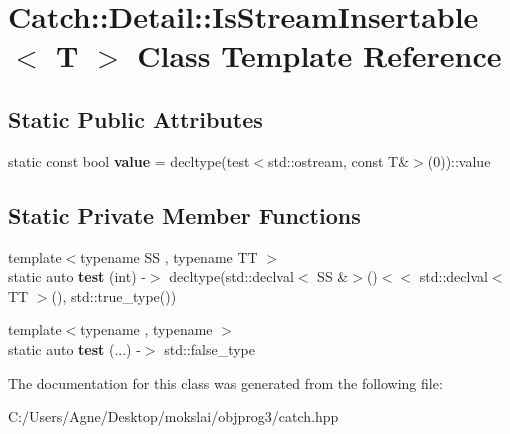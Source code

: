 \hypertarget{class_catch_1_1_detail_1_1_is_stream_insertable}{}\section{Catch\+:\+:Detail\+:\+:Is\+Stream\+Insertable$<$ T $>$ Class Template Reference}
\label{class_catch_1_1_detail_1_1_is_stream_insertable}
\subsection*{Static Public Attributes}
\begin{DoxyCompactItemize}
\item 
\mbox{\label{class_catch_1_1_detail_1_1_is_stream_insertable_a42818b09ae5851126a70ee263769e309}} 
static const bool {\bfseries value} = decltype(test$<$std\+::ostream, const T\&$>$(0))\+::value
\end{DoxyCompactItemize}
\subsection*{Static Private Member Functions}
\begin{DoxyCompactItemize}
\item 
\mbox{\label{class_catch_1_1_detail_1_1_is_stream_insertable_a8078716859ae977872372cdd711c4258}} 
{\footnotesize template$<$typename SS , typename TT $>$ }\\static auto {\bfseries test} (int) -\/$>$ decltype(std\+::declval$<$ SS \&$>$()$<$$<$ std\+::declval$<$ TT $>$(), std\+::true\+\_\+type())
\item 
\mbox{\label{class_catch_1_1_detail_1_1_is_stream_insertable_ac5761375646929916dc5e165d44cd3d9}} 
{\footnotesize template$<$typename , typename $>$ }\\static auto {\bfseries test} (...) -\/$>$ std\+::false\+\_\+type
\end{DoxyCompactItemize}


The documentation for this class was generated from the following file\+:\begin{DoxyCompactItemize}
\item 
C\+:/\+Users/\+Agne/\+Desktop/mokslai/objprog3/catch.\+hpp\end{DoxyCompactItemize}
